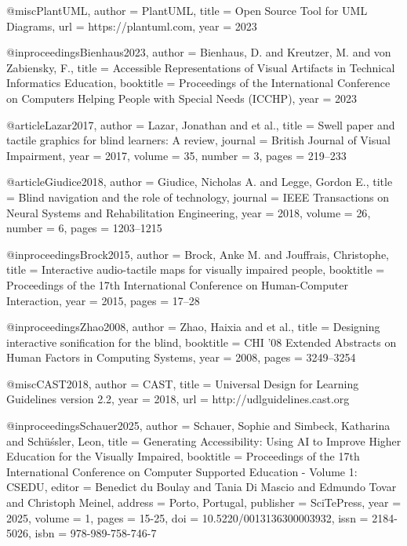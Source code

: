 @misc{PlantUML,
  author    = {PlantUML},
  title     = {Open Source Tool for UML Diagrams},
  url       = {https://plantuml.com},
  year      = {2023}
}

@inproceedings{Bienhaus2023,
  author    = {Bienhaus, D. and Kreutzer, M. and von Zabiensky, F.},
  title     = {Accessible Representations of Visual Artifacts in Technical Informatics Education},
  booktitle = {Proceedings of the International Conference on Computers Helping People with Special Needs (ICCHP)},
  year      = {2023}
}

@article{Lazar2017,
  author    = {Lazar, Jonathan and et al.},
  title     = {Swell paper and tactile graphics for blind learners: A review},
  journal   = {British Journal of Visual Impairment},
  year      = {2017},
  volume    = {35},
  number    = {3},
  pages     = {219--233}
}

@article{Giudice2018,
  author    = {Giudice, Nicholas A. and Legge, Gordon E.},
  title     = {Blind navigation and the role of technology},
  journal   = {IEEE Transactions on Neural Systems and Rehabilitation Engineering},
  year      = {2018},
  volume    = {26},
  number    = {6},
  pages     = {1203--1215}
}

@inproceedings{Brock2015,
  author    = {Brock, Anke M. and Jouffrais, Christophe},
  title     = {Interactive audio-tactile maps for visually impaired people},
  booktitle = {Proceedings of the 17th International Conference on Human-Computer Interaction},
  year      = {2015},
  pages     = {17--28}
}

@inproceedings{Zhao2008,
  author    = {Zhao, Haixia and et al.},
  title     = {Designing interactive sonification for the blind},
  booktitle = {CHI '08 Extended Abstracts on Human Factors in Computing Systems},
  year      = {2008},
  pages     = {3249--3254}
}

@misc{CAST2018,
  author    = {CAST},
  title     = {Universal Design for Learning Guidelines version 2.2},
  year      = {2018},
  url       = {http://udlguidelines.cast.org}
}


@inproceedings{Schauer2025,
	author = {Schauer, Sophie and Simbeck, Katharina and Sch{\"u}{\'ss}ler,  Leon},
	title = {Generating Accessibility: Using AI to Improve Higher Education for the Visually Impaired},
	booktitle = {Proceedings of the 17th International Conference on Computer Supported Education - Volume 1: CSEDU},
	editor = {Benedict du Boulay and Tania Di Mascio and Edmundo Tovar and Christoph Meinel},
	address = {Porto, Portugal},
	publisher = {SciTePress},
	year = {2025},
	volume = {1},
	pages = {15-25},
	doi = {10.5220/0013136300003932},
	issn = {2184-5026},
	isbn = {978-989-758-746-7}
}


